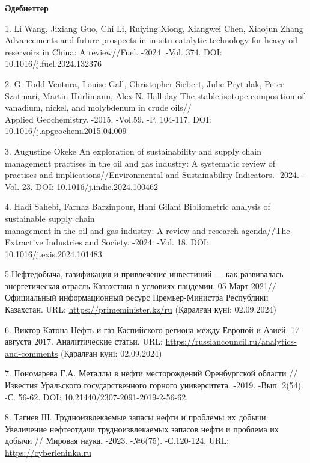 \begin{center}
  {\bfseries Әдебиеттер}
  \end{center}
  \begin{references}
1. Li Wang, Jixiang Guo, Chi Li, Ruiying Xiong, Xiangwei Chen, Xiaojun
Zhang Advancements and future prospects in in-situ catalytic technology
for heavy oil reservoirs in China: A review//Fuel. -2024. -Vol. 374.
DOI: 10.1016/j.fuel.2024.132376

2. G. Todd Ventura, Louise Gall, Christopher Siebert, Julie Prytulak,
Peter Szatmari, Martin Hürlimann, Alex N. Halliday The stable isotope
composition of vanadium, nickel, and molybdenum in crude oils//\\Applied
Geochemistry. -2015. -Vol.59. -P. 104-117. DOI:
10.1016/j.apgeochem.2015.04.009

3. Augustine Okeke An exploration of sustainability and supply chain
management practises in the oil and gas industry: A systematic review of
practises and implications//Environmental and Sustainability Indicators.
-2024. -Vol. 23. DOI: 10.1016/j.indic.2024.100462

4. Hadi Sahebi, Farnaz Barzinpour, Hani Gilani Bibliometric analysis of
sustainable supply chain \\management in the oil and gas industry: A
review and research agenda//The Extractive Industries and Society.
-2024. -Vol. 18. DOI: 10.1016/j.exis.2024.101483

5.Нефтедобыча, газификация и привлечение инвестиций --- как развивалась
энергетическая отрасль Казахстана в условиях пандемии. 05 Март
2021//Официальный информационный ресурс Премьер-Министра Республики
Казахстан. 
URL:
\href{https://primeminister.kz/ru/news/neftedobycha-gazifikaciya-i-privlechenie-investiciy-kak-razvivalas-energeticheskaya-otrasl-kazahstana-v-usloviyah-pandemii-52034}{https://primeminister.kz/ru}
(Қаралған күні: 02.09.2024)

6. Виктор Катона Нефть и газ Каспийского региона между Европой и Азией.
17 августа 2017. Аналитические статьи. URL:
\href{https://russiancouncil.ru/analytics-and-comments/analytics/neft-i-gaz-kaspiyskogo-regiona-mezhdu-evropoy-i-aziey/}{https://russiancouncil.ru/analytics-and-comments}
(Қаралған күні: 02.09.2024)

7. Пономарева Г.А. Металлы в нефти месторождений Оренбургской области
//Известия Уральского государственного горного университета. -2019.
-Вып. 2(54). -С. 56-62. DOI: 10.21440/2307-2091-2019-2-56-62.

8. Тагиев Ш. Трудноизвлекаемые запасы нефти и проблемы их добычи:
Увеличение нефтеотдачи трудноизвлекаемых запасов нефти и проблема их
добычи // Мировая наука. -2023. -№6(75). -С.120-124. URL:
\href{https://cyberleninka.ru/article/n/trudnoizvlekaemye-zapasy-nefti-i-problemy-ih-dobychi-uvelechenie-nefteotdachi-trudnoizvlekaemyh-zapasov-nefti-i-problema-ih-dobychi/viewer}{https://cyberleninka.ru}


\end{references}
